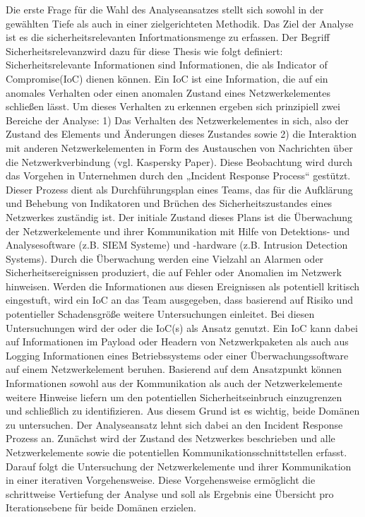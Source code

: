 Die erste Frage für die Wahl des Analyseansatzes stellt sich sowohl in der gewählten Tiefe als auch in einer zielgerichteten Methodik. Das Ziel der Analyse ist es die sicherheitsrelevanten Infortmationsmenge zu erfassen. Der Begriff \glqq Sicherheitsrelevanz\grqq  wird dazu für diese Thesis wie folgt definiert: Sicherheitsrelevante Informationen sind Informationen, die als \glqq Indicator of Compromise\grqq  (IoC) dienen können. 
Ein IoC ist eine Information, die auf ein anomales Verhalten oder einen anomalen Zustand eines Netzwerkelementes schließen lässt. Um dieses Verhalten zu erkennen ergeben sich prinzipiell zwei Bereiche der Analyse: 1) Das Verhalten des Netzwerkelementes in sich, also der Zustand des Elements und Änderungen dieses Zustandes sowie 2) die Interaktion mit anderen Netzwerkelementen in Form des Austauschen von Nachrichten über die Netzwerkverbindung (vgl. Kaspersky Paper).
Diese Beobachtung wird durch das Vorgehen in Unternehmen durch den „Incident Response Process“ gestützt. Dieser Prozess dient als Durchführungsplan eines Teams, das für die Aufklärung und Behebung von Indikatoren und Brüchen des Sicherheitszustandes eines Netzwerkes  
zuständig ist. Der initiale Zustand dieses Plans ist die Überwachung der Netzwerkelemente und ihrer Kommunikation mit Hilfe von Detektions- und Analysesoftware (z.B. SIEM Systeme) und -hardware (z.B. \glqq Intrusion Detection Systems\grqq ). Durch die Überwachung werden eine Vielzahl an Alarmen oder Sicherheitsereignissen produziert, die auf Fehler oder Anomalien im Netzwerk hinweisen. Werden die Informationen aus diesen Ereignissen als potentiell kritisch eingestuft, wird ein IoC an das Team ausgegeben, dass basierend auf Risiko und potentieller Schadensgröße weitere Untersuchungen einleitet. Bei diesen Untersuchungen wird der oder die IoC(s) als Ansatz genutzt. Ein IoC kann dabei auf Informationen im Payload oder Headern von Netzwerkpaketen als auch aus Logging Informationen eines Betriebssystems oder einer Überwachungssoftware auf einem Netzwerkelement beruhen. Basierend auf dem Ansatzpunkt können Informationen sowohl aus der Kommunikation als auch der Netzwerkelemente weitere Hinweise liefern um den potentiellen Sicherheitseinbruch einzugrenzen und schließlich zu identifizieren.
Aus diesem Grund ist es wichtig, beide Domänen zu untersuchen. Der Analyseansatz lehnt sich dabei an den Incident Response Prozess an. Zunächst wird der Zustand des Netzwerkes beschrieben und alle Netzwerkelemente sowie die potentiellen Kommunikationsschnittstellen erfasst. Darauf folgt die Untersuchung der Netzwerkelemente und ihrer Kommunikation in einer iterativen Vorgehensweise. Diese Vorgehensweise ermöglicht die schrittweise Vertiefung der Analyse  und soll als Ergebnis eine Übersicht pro Iterationsebene für beide Domänen erzielen. 

